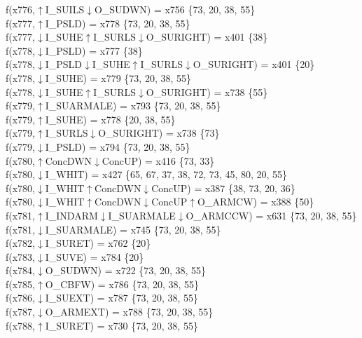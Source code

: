 f(x776,$\uparrow$I\_SUILS$\downarrow$O\_SUDWN) = x756 \{73, 20, 38, 55\} \\  
f(x777,$\uparrow$I\_PSLD) = x778 \{73, 20, 38, 55\} \\  
f(x777,$\downarrow$I\_SUHE$\uparrow$I\_SURLS$\downarrow$O\_SURIGHT) = x401 \{38\} \\  
f(x778,$\downarrow$I\_PSLD) = x777 \{38\} \\  
f(x778,$\downarrow$I\_PSLD$\downarrow$I\_SUHE$\uparrow$I\_SURLS$\downarrow$O\_SURIGHT) = x401 \{20\} \\  
f(x778,$\downarrow$I\_SUHE) = x779 \{73, 20, 38, 55\} \\  
f(x778,$\downarrow$I\_SUHE$\uparrow$I\_SURLS$\downarrow$O\_SURIGHT) = x738 \{55\} \\  
f(x779,$\uparrow$I\_SUARMALE) = x793 \{73, 20, 38, 55\} \\  
f(x779,$\uparrow$I\_SUHE) = x778 \{20, 38, 55\} \\  
f(x779,$\uparrow$I\_SURLS$\downarrow$O\_SURIGHT) = x738 \{73\} \\  
f(x779,$\downarrow$I\_PSLD) = x794 \{73, 20, 38, 55\} \\  
f(x780,$\uparrow$ConcDWN$\downarrow$ConcUP) = x416 \{73, 33\} \\  
f(x780,$\downarrow$I\_WHIT) = x427 \{65, 67, 37, 38, 72, 73, 45, 80, 20, 55\} \\  
f(x780,$\downarrow$I\_WHIT$\uparrow$ConcDWN$\downarrow$ConcUP) = x387 \{38, 73, 20, 36\} \\  
f(x780,$\downarrow$I\_WHIT$\uparrow$ConcDWN$\downarrow$ConcUP$\uparrow$O\_ARMCW) = x388 \{50\} \\  
f(x781,$\uparrow$I\_INDARM$\downarrow$I\_SUARMALE$\downarrow$O\_ARMCCW) = x631 \{73, 20, 38, 55\} \\  
f(x781,$\downarrow$I\_SUARMALE) = x745 \{73, 20, 38, 55\} \\  
f(x782,$\downarrow$I\_SURET) = x762 \{20\} \\  
f(x783,$\downarrow$I\_SUVE) = x784 \{20\} \\  
f(x784,$\downarrow$O\_SUDWN) = x722 \{73, 20, 38, 55\} \\  
f(x785,$\uparrow$O\_CBFW) = x786 \{73, 20, 38, 55\} \\  
f(x786,$\downarrow$I\_SUEXT) = x787 \{73, 20, 38, 55\} \\  
f(x787,$\downarrow$O\_ARMEXT) = x788 \{73, 20, 38, 55\} \\  
f(x788,$\uparrow$I\_SURET) = x730 \{73, 20, 38, 55\} \\  
